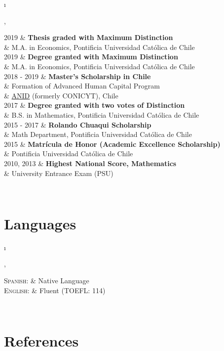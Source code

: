 \documentclass[a4paper, 10pt]{article}
\newcommand{\tablength}{}
\newcommand{\setTabParams}[1]{\renewcommand\tablength{}\forcsvlist{\listadd\tablength}{#1}}
\newcommand{\setCols}[1]{			%
	\ifnum0=\i						%
		\ifdim0cm=#1				%
			\def \firstCol {r}		%
		\else						%
			\def \firstCol {p{#1}}		%
		\fi						%
	\else \ifnum1=\i				%
		\ifdim0cm=#1				%
			\def \secondCol {l}		%
		\else						%
			\def \secondCol{p{#1}}	%
		\fi						%
	\else \ifnum2=\i				%
		\ifnum0=#1				%
			\def \sep {}			%
		\else						%
			\def \sep {|}			%
		\fi						%
	\fi \fi \fi						%
	\advance\i by1					%
}
\newcommand{\tab}[1]{					%
	\newcount\i						%
	\forlistloop{\setCols}{\tablength}		%
	\begin{tabular}{\firstCol \sep \secondCol}	%
		#1							%
	\end{tabular} \\						%
}
\begin{document}
\tab{
\textsc{2019}
	&	\textbf{Thesis graded with Maximum Distinction}				\\[0.2ex]
	&	M.A. in Economics, Pontificia Universidad Católica de Chile		\\[2ex]

\textsc{2019}
	&	\textbf{Degree granted with Maximum Distinction}			\\[0.2ex]
	&	M.A. in Economics, Pontificia Universidad Católica de Chile		\\[2ex]

\textsc{2018 - 2019} 
	&	\textbf{Master's Scholarship in Chile}						\\[0.2ex]
	&	Formation of Advanced Human Capital Program				\\[0.2ex]
	&	\href{https://www.anid.cl}{ANID} (formerly CONICYT), Chile		\\[2ex]
	
\textsc{2017}
	&	\textbf{Degree granted with two votes of Distinction}			\\[0.2ex]
	&	B.S. in Mathematics, Pontificia Universidad Católica de Chile	\\[2ex]

\textsc{2015 - 2017} 
	&	\textbf{Rolando Chuaqui Scholarship}						\\[0.2ex]
	&	Math Department, Pontificia Universidad Católica de Chile		\\[2ex]
	
\textsc{2015}
	&	\textbf{Matrícula de Honor (Academic Excellence Scholarship)}	\\[0.2ex]
	&	Pontificia Universidad Católica de Chile						\\[2ex]

\textsc{2010, 2013}
	&	\textbf{Highest National Score, Mathematics}				\\[0.2ex]
	&	 University Entrance Exam (PSU)							\\	
}

\section{Languages}
\setTabParams{0cm,0cm,0}

\tab{
\textsc{Spanish:} 
	&	Native Language	\\[0.2ex]

\textsc{English:}
	&	Fluent (TOEFL: 114)
}

\section{References}
\setTabParams{0cm,0cm,0}
\end{document}

